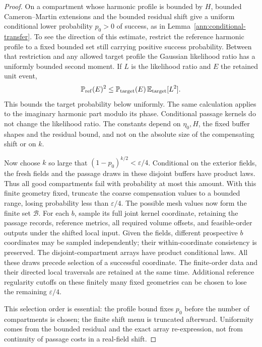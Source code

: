 \begin{proof}
On a compartment whose harmonic profile is bounded by $H$, bounded
Cameron--Martin extensions and the bounded residual shift give a
uniform conditional lower probability $p_0>0$ of success, as in
Lemma~\ref{ann:conditional-transfer}.  To see the
direction of this estimate, restrict the reference harmonic profile
to a fixed bounded set still carrying positive success probability.
Between that restriction and any allowed target profile the Gaussian
likelihood ratio has a uniformly bounded second moment.  If $L$ is
the likelihood ratio and $E$ the retained unit event,
\[
 \mathbb P_{\rm ref}(E)^2
 \leq \mathbb P_{\rm target}(E)\,
       \mathbb E_{\rm target}[L^2].
\]
This bounds the target probability below uniformly.  The same
calculation applies to the imaginary harmonic part modulo its phase.
Conditional passage kernels do not change the likelihood ratio.
The constants depend on $\eta_0,H$, the fixed buffer shapes and the
residual bound, and not on the absolute size of the compensating
shift or on $k$.

Now choose $k$ so large that $(1-p_0)^{k/2}<\varepsilon/4$.
Conditional on the exterior fields, the fresh fields and the passage
draws in these disjoint buffers have product laws.  Thus all good
compartments fail with probability at most this amount.  With this
finite geometry fixed, truncate the coarse compensation values to a
bounded range, losing probability less than $\varepsilon/4$.
The possible mesh values now form the finite set $\mathcal B$.
For each $b$, sample its full joint kernel coordinate, retaining the
passage records, reference metrics, all required volume offsets, and
feasible-order outputs under the shifted local input.  Given the
fields, different prospective $b$ coordinates may be sampled
independently; their within-coordinate consistency is preserved.
The disjoint-compartment arrays have product conditional laws.
All these draws precede selection of a successful coordinate.
The finite-order data and their directed local traversals are
retained at the same time.  Additional reference
regularity cutoffs on these finitely many fixed geometries can be
chosen to lose the remaining $\varepsilon/4$.

This selection order is essential: the profile bound fixes $p_0$
before the number of compartments is chosen; the finite shift menu is
truncated afterward.  Uniformity comes from the bounded residual and
the exact array re-expression, not from continuity of passage costs
in a real-field shift.
\end{proof}

